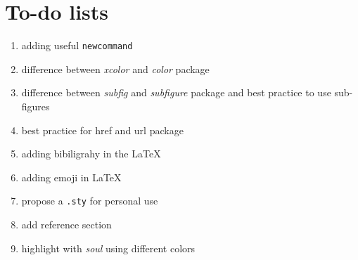 \section{To-do lists}

\begin{enumerate}
    \item adding useful \texttt{newcommand}
    \item difference between \textit{xcolor} and \textit{color} package
    \item difference between \textit{subfig} and \textit{subfigure} package and best practice to use sub-figures
    \item best practice for href and url package
    \item adding bibiligrahy in the \LaTeX
    \item adding emoji in \LaTeX
    \item propose a \texttt{.sty} for personal use
    \item add reference section
    \item highlight with \textit{soul} using different colors
\end{enumerate}